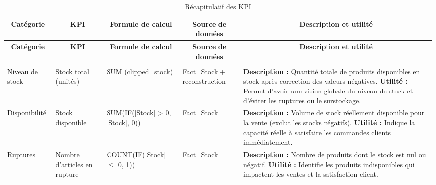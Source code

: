 {\footnotesize
\renewcommand{\arraystretch}{1.3}
\setlength{\tabcolsep}{3pt}


\begin{longtable}{|p{2cm}|p{1.8cm}|p{2.8cm}|p{2.2cm}|p{6cm}|}

\caption{Récapitulatif des KPI} \\

\hline
\multicolumn{1}{|c|}{\textbf{Catégorie}} & 
\multicolumn{1}{c|}{\textbf{KPI}} & 
\multicolumn{1}{c|}{\textbf{Formule de calcul}} & 
\multicolumn{1}{c|}{\textbf{Source de données}} & 
\multicolumn{1}{c|}{\textbf{Description et utilité}} \\
\hline
\endfirsthead

\hline
\multicolumn{1}{|c|}{\textbf{Catégorie}} & 
\multicolumn{1}{c|}{\textbf{KPI}} & 
\multicolumn{1}{c|}{\textbf{Formule de calcul}} & 
\multicolumn{1}{c|}{\textbf{Source de données}} & 
\multicolumn{1}{c|}{\textbf{Description et utilité}} \\
\hline
\endhead

\hline
\endfoot


\multicolumn{5}{|c|}{\cellcolor{gray!25}\textbf{LES KPIs DU STOCK}} \\
\hline

Niveau de stock & Stock total (unités) & SUM (clipped\_stock) & Fact\_Stock + reconstruction & \textbf{Description :} Quantité totale de produits disponibles en stock après correction des valeurs négatives. \newline \textbf{Utilité :} Permet d'avoir une vision globale du niveau de stock et d'éviter les ruptures ou le surstockage. \\
\hline

Disponibilité & Stock disponible & SUM(IF([Stock] > 0, [Stock], 0)) & Fact\_Stock & \textbf{Description :} Volume de stock réellement disponible pour la vente (exclut les stocks négatifs). \newline \textbf{Utilité :} Indique la capacité réelle à satisfaire les commandes clients immédiatement. \\
\hline

Ruptures & Nombre d'articles en rupture & COUNT(IF([Stock] $\leq$ 0, 1)) & Fact\_Stock & \textbf{Description :} Nombre de produits dont le stock est nul ou négatif. \newline \textbf{Utilité :} Identifie les produits indisponibles qui impactent les ventes et la satisfaction client. \\
\hline


\end{longtable}}
